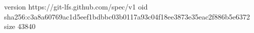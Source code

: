 version https://git-lfs.github.com/spec/v1
oid sha256:c3a8a60769ac1d5eef1bdbbc03b0117a93c04f18ee3873e35eac2f886b5e6372
size 43840
